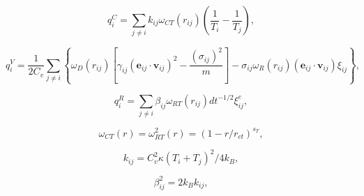 \documentclass[12pt]{article}
\begin{document}
$$
  q_i^C = \sum_{j \ne i} k_{ij} \omega_{CT}(r_{ij}) \left( \frac{1}{T_i} - \frac{1}{T_j} \right),
$$  
  
$$
  q_i^V = \frac{1}{2 C_v}\sum_{j \ne i}{ \left\{ \omega_D(r_{ij})\left[\gamma_{ij} \left( \mathbf{e}_{ij} \cdot \mathbf{v}_{ij} \right)^2 - \frac{\left( \sigma _{ij} \right)^2}{m}\right] - \sigma _{ij} \omega_R(r_{ij})\left( \mathbf{e}_{ij} \cdot \mathbf{v}_{ij} \right){\xi_{ij}} \right\} },
$$  

$$
  q_i^R = \sum_{j \ne i} \beta _{ij} \omega_{RT}(r_{ij}) d {t^{ - 1/2}} \xi_{ij}^e,
$$

$$
  \omega_{CT}(r)=\omega_{RT}^2(r)=\left(1-r/r_{ct}\right)^{s_T},
$$

$$
  k_{ij}=C_v^2\kappa(T_i + T_j)^2/4k_B,
$$

$$
  \beta_{ij}^2=2k_Bk_{ij},
$$
\end{document}
